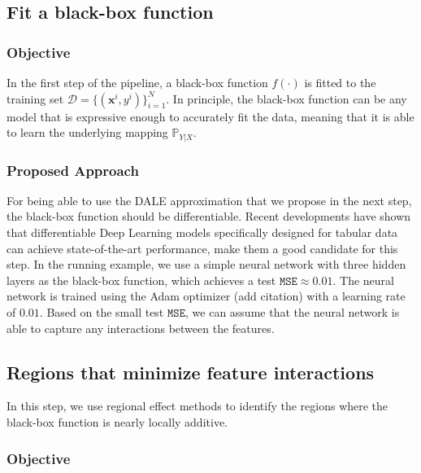 \documentclass[12pt]{article}
\newcommand{\xb}{\mathbf{x}}
\begin{document}
\subsection{Fit a black-box function}

\subsubsection{Objective}

In the first step of the pipeline, a black-box function \(f(\cdot)\) is fitted to the training set \(\mathcal{D} = \{(\xb^i, y^i)\}_{i=1}^N\).
In principle, the black-box function can be any model that is expressive enough to accurately fit the data,
meaning that it is able to learn the underlying mapping \(\mathbb{P}_{Y|X}\).

\subsubsection{Proposed Approach}

For being able to use the DALE approximation that we propose in the next step,
the black-box function should be differentiable.
Recent developments have shown that differentiable Deep Learning models specifically designed for tabular
data~\citep{arik2021tabnet} can achieve state-of-the-art performance, make them a good candidate for this step.
In the running example, we use a simple neural network with three hidden layers as the black-box function,
which achieves a test \(\texttt{MSE} \approx 0.01\).
The neural network is trained using the Adam optimizer (add citation) with a learning rate of \(0.01\).
Based on the small test \(\texttt{MSE}\), we can assume that the neural network is able to capture any interactions
between the features.

\subsection{Regions that minimize feature interactions}
\label{subsec:regional_effect_methods}

In this step, we use regional effect methods to identify the regions where the black-box function is nearly locally additive.

\subsubsection{Objective}
\end{document}
